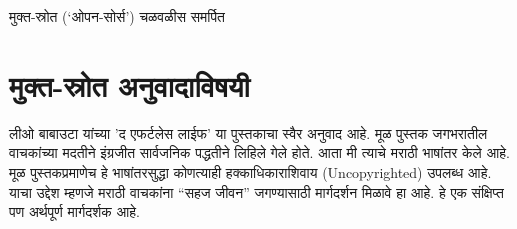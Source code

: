 \begin{dedication}
मुक्त-स्रोत (`ओपन-सोर्स') चळवळीस  समर्पित  
\end{dedication}

\clearpage

\chapter*{मुक्त-स्रोत अनुवादाविषयी}
लीओ बाबाउटा यांच्या 'द एफर्टलेस लाईफ' या पुस्तकाचा स्वैर अनुवाद आहे.  मूळ पुस्तक जगभरातील वाचकांच्या मदतीने इंग्रजीत सार्वजनिक पद्धतीने लिहिले गेले होते.  आता मी त्याचे मराठी भाषांतर केले आहे.   मूळ पुस्तकप्रमाणेच  हे भाषांतरसुद्धा  कोणत्याही हक्काधिकाराशिवाय (Uncopyrighted) उपलब्ध आहे.  
याचा उद्देश म्हणजे मराठी वाचकांना ``सहज जीवन'' जगण्यासाठी मार्गदर्शन मिळावे हा आहे.  हे एक संक्षिप्त पण अर्थपूर्ण मार्गदर्शक आहे.

